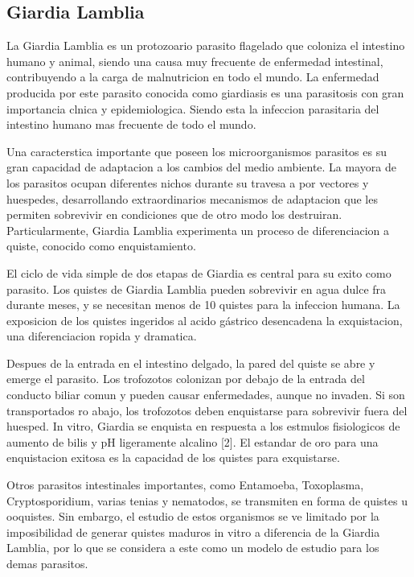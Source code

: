   \subsection{Giardia Lamblia}
    La Giardia Lamblia es un protozoario parasito flagelado que coloniza el intestino humano
    y animal, siendo una causa muy frecuente de enfermedad intestinal, contribuyendo a la carga
    de malnutricion en todo el mundo. La enfermedad producida por este parasito conocida
    como giardiasis es una parasitosis con gran importancia clnica y epidemiologica. Siendo esta
    la infeccion parasitaria del intestino humano mas frecuente de todo el mundo.

    Una caracterstica importante que poseen los microorganismos parasitos es su gran capacidad de
    adaptacion a los cambios del medio ambiente. La mayora de los parasitos ocupan
    diferentes nichos durante su travesa a por vectores y huespedes, desarrollando extraordinarios
    mecanismos de adaptacion que les permiten sobrevivir en condiciones que de otro modo
    los destruiran. Particularmente, Giardia Lamblia experimenta un proceso de diferenciacion
    a quiste, conocido como enquistamiento.

    El ciclo de vida simple de dos etapas de Giardia es central para su exito como parasito. Los
    quistes de Giardia Lamblia pueden sobrevivir en agua dulce fra durante meses, y se necesitan
    menos de 10 quistes para la infeccion humana. La exposicion de los quistes ingeridos al acido
    gástrico desencadena la exquistacion, una diferenciacion ropida y dramatica.

    Despues de la entrada en el intestino delgado, la pared del quiste se abre y emerge el
    parasito. Los trofozotos colonizan por debajo de la entrada del conducto biliar comun y pueden
    causar enfermedades, aunque no invaden. Si son transportados ro abajo, los trofozotos
    deben enquistarse para sobrevivir fuera del huesped. In vitro, Giardia se enquista en respuesta a
    los estmulos fisiologicos de aumento de bilis y pH ligeramente alcalino [2]. El estandar
    de oro para una enquistacion exitosa es la capacidad de los quistes para exquistarse.

    Otros parasitos intestinales importantes, como Entamoeba, Toxoplasma, Cryptosporidium, varias
    tenias y nematodos, se transmiten en forma de quistes u ooquistes. Sin embargo,
    el estudio de estos organismos se ve limitado por la imposibilidad de generar quistes maduros
    in vitro a diferencia de la Giardia Lamblia, por lo que se considera a este como un modelo
    de estudio para los demas parasitos.

